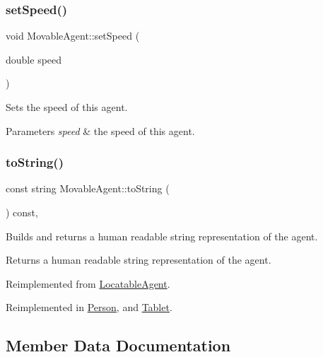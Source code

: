 \mbox{\label{class_movable_agent_ae2ef452e81789a4370e7dee32a9cc67e}} 
\subsubsection{\texorpdfstring{setSpeed()}{setSpeed()}}
{\footnotesize\ttfamily void Movable\+Agent\+::set\+Speed (\begin{DoxyParamCaption}\item[{double}]{speed }\end{DoxyParamCaption})}

Sets the speed of this agent. 
\begin{DoxyParams}{Parameters}
{\em speed} & the speed of this agent. \\
\hline
\end{DoxyParams}
\mbox{\label{class_movable_agent_a1dee2a6bf93f01006fadfb6fba6c9a59}} 
\subsubsection{\texorpdfstring{toString()}{toString()}}
{\footnotesize\ttfamily const string Movable\+Agent\+::to\+String (\begin{DoxyParamCaption}{ }\end{DoxyParamCaption}) const\hspace{0.3cm}{\ttfamily [override]}, {\ttfamily [virtual]}}

Builds and returns a human readable string representation of the agent. \begin{DoxyReturn}{Returns}
a human readable string representation of the agent. 
\end{DoxyReturn}


Reimplemented from \mbox{\hyperlink{class_locatable_agent_a88674f4c8ab9b1b2f3986b226bf4244f}{Locatable\+Agent}}.



Reimplemented in \mbox{\hyperlink{class_person_a68872538da519d0a04297f43376db27c}{Person}}, and \mbox{\hyperlink{class_tablet_a3fae01e7d526699476221c6a686a4fba}{Tablet}}.



\subsection{Member Data Documentation}
\mbox{\label{class_movable_agent_ac725b42e7b968740a59c3e1033d69ac5}} 
